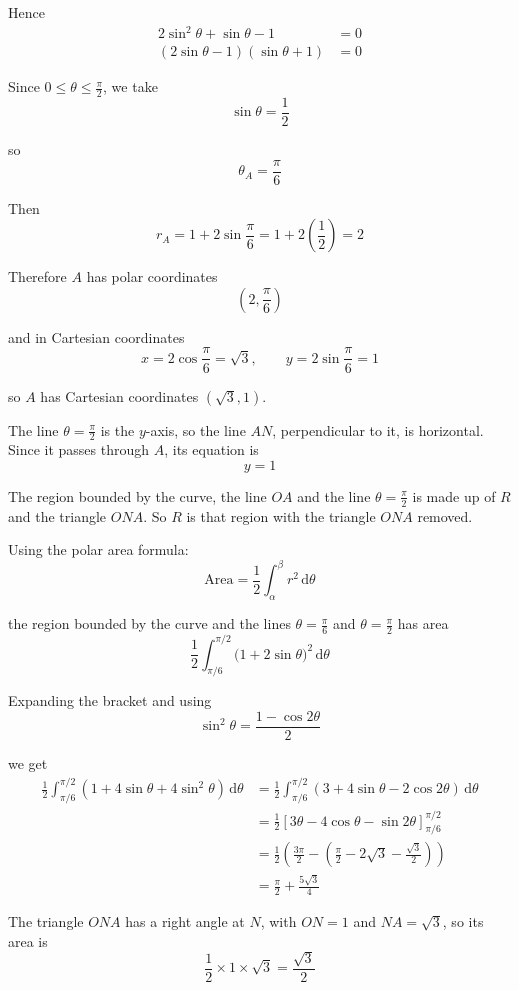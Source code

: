 \documentclass[leqno]{article}
\begin{document}
\begin{enumerate}[
	  label=\textbf{\arabic*.},
	  leftmargin=*,
	  topsep=0pt,
	  partopsep=0pt,
	  parsep=0pt
	]
\begin{djsSolution}
	Hence
	\begin{align*}
	2\sin^2\theta+\sin\theta-1&=0\\
	(2\sin\theta-1)(\sin\theta+1)&=0
	\end{align*}

	Since $0\leq \theta \leq \frac{\pi}{2}$, we take
	\[
	\sin\theta=\frac12
	\]

	so
	\[
	\theta_A=\frac{\pi}{6}
	\]

	Then
	\[
	r_A=1+2\sin\frac{\pi}{6}=1+2\left(\frac12\right)=2
	\]

	Therefore $A$ has polar coordinates
	\[
	\left(2,\frac{\pi}{6}\right)
	\]

	and in Cartesian coordinates
	\[
	x=2\cos\frac{\pi}{6}=\sqrt{3}, \qquad y=2\sin\frac{\pi}{6}=1
	\]

	so $A$ has Cartesian coordinates $(\sqrt{3},1)$.
	
	The line $\theta=\frac{\pi}{2}$ is the $y$-axis, so the line $AN$, perpendicular to it, is horizontal. Since it passes through $A$, its equation is
	\[
	y=1
	\]

	The region bounded by the curve, the line $OA$ and the line $\theta=\frac{\pi}{2}$ is made up of $R$ and the triangle $ONA$. So $R$ is that region with the triangle $ONA$ removed.

	Using the polar area formula:
	\[
	\text{Area}=\frac12\int_{\alpha}^{\beta} r^2\,\mathrm{d}\theta
	\]

	the region bounded by the curve and the lines $\theta=\frac{\pi}{6}$ and $\theta=\frac{\pi}{2}$ has area
	\[
	\frac12\int_{\pi/6}^{\pi/2}\bigl(1+2\sin\theta\bigr)^2\,\mathrm{d}\theta
	\]

	Expanding the bracket and using
	\[
	\sin^2\theta=\frac{1-\cos 2\theta}{2}
	\]

	we get
	\begin{align*}
	\frac12\int_{\pi/6}^{\pi/2}\left(1+4\sin\theta+4\sin^2\theta\right)\,\mathrm{d}\theta
	&=\frac12\int_{\pi/6}^{\pi/2}\left(3+4\sin\theta-2\cos2\theta\right)\,\mathrm{d}\theta\\
	&=\frac12\left[3\theta-4\cos\theta-\sin2\theta\right]_{\pi/6}^{\pi/2}\\
	&=\frac12\left(\frac{3\pi}{2}-\left(\frac{\pi}{2}-2\sqrt3-\frac{\sqrt3}{2}\right)\right)\\
	&=\frac{\pi}{2}+\frac{5\sqrt3}{4}
	\end{align*}

	The triangle $ONA$ has a right angle at $N$, with $ON=1$ and $NA=\sqrt3$, so its area is
	\[
	\frac12\times1\times\sqrt3=\frac{\sqrt3}{2}
	\]


\end{djsSolution}
\end{enumerate}
\end{document}
